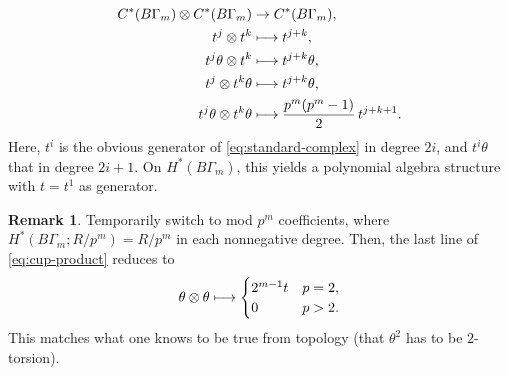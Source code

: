 \documentclass[10pt,a4paper]{amsart}
\newcommand\mto{\mathchoice{\longmapsto}{\mapsto}{\mapsto}{\mapsto}}
\theoremstyle{plain}
\theoremstyle{definition}
\newtheorem{remark}[theorem]{Remark}
\begin{document}
\begin{equation} \label{eq:cup-product}
\begin{aligned}
C^*(B\Gamma_m) \otimes C^*(B\Gamma_m) &\to C^*(B\Gamma_m), \\
t^j \otimes t^k &\mto t^{j+k}, \\
t^j\theta \otimes t^k &\mto t^{j+k}\theta, \\
t^j \otimes t^k\theta &\mto t^{j+k}\theta, \\
t^j\theta \otimes t^k\theta &\mto\frac{p^m(p^m-1)}{2}\, t^{j+k+1}.
\end{aligned}
\end{equation}
Here, $t^i$ is the obvious generator of \eqref{eq:standard-complex} in degree $2i$, and $t^i\theta$ that in degree $2i+1$. On $H^*(B\Gamma_m)$, this yields a polynomial algebra structure with $t = t^1$ as generator.

\begin{remark}
Temporarily switch to mod $p^m$ coefficients, where $H^*(B\Gamma_m;R/p^m) = R/p^m$ in each nonnegative degree. Then, the last line of \eqref{eq:cup-product} reduces to
\begin{equation*}
\theta \otimes \theta \mto \begin{cases} 2^{m-1} t & p = 2, \\
0 & p>2.
\end{cases}
\end{equation*}
This matches what one knows to be true from topology (that $\theta^2$ has to be $2$-torsion).
\end{remark}
\end{document}
